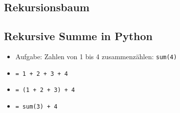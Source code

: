 \subsection{Rekursionsbaum}

\newcommand{\mytree}{
    \ifnum \val = 0
        \draw[draw=., ultra thick] (\x,\y) rectangle 	++(0.75,0.75);
        \node at (\x+0.375,\y+0.375) {f(\the\val)};
    \fi
    \ifnum \val = 1
        \draw[draw=., ultra thick] (\x,\y) rectangle 	++(0.75,0.75);
        \node at (\x+0.375,\y+0.375) {f(\the\val)};
    \fi
    \ifnum \val > 1

        \draw[draw=., ultra thick] (\x,\y) rectangle ++(0.75,0.75);
        \node at (\x+0.375,\y+0.375) {f(\the\val)};

        \advance \val -1
        \advance \y -2
        \tmp=-\val*0.01
        \advance \tmp -1

        \advance \x \tmp
        \draw [->, thick] (\x-\tmp,\y+2) -- (\x+0.75,\y+0.75);
        \mytree;

        \tmp=\val*0.01
        \advance \tmp 1

        \advance \x \tmp
        \advance \val -1
        \tmp=\val*0.01
        \advance \tmp 1

        \advance \x \tmp

        \draw [->, thick] (\x-\tmp+0.75,\y+2) -- (\x,\y+0.75);
        \mytree;

        \tmp=-\val*0.01
        \advance \tmp -1

        \advance \val +2
        \advance \x \tmp
        \advance \y +2
    \fi
}


\begin{frame}
    \slidehead
    \centering
    \vspace{-0.1cm}
\end{frame}



\subsection{Rekursive Summe in Python}
\begin{frame}
    \slidehead

    \begin{itemize}
        \item Aufgabe: Zahlen von 1 bis 4 zusammenzählen: \texttt{sum(4)} \pause
        \item \texttt{= 1 + 2 + 3 + 4} \pause
        \item \texttt{= (1 + 2 + 3) + 4} \pause
        \item \texttt{= sum(3) + 4}
    \end{itemize}
    \vspace{1em}
    \pause
\end{frame}

